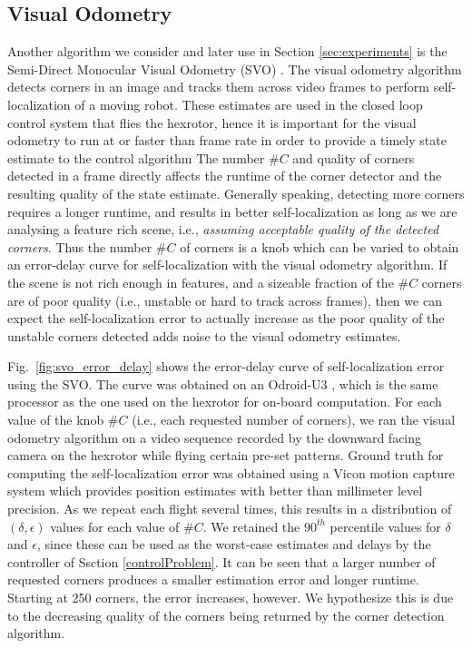 \subsection{Visual Odometry} \label{sec:visual_odometry}




Another algorithm we consider and later use in Section  \ref{sec:experiments} is the Semi-Direct Monocular Visual Odometry (SVO) \cite{forster2014svo}.
The visual odometry algorithm detects corners in an image and tracks them across video frames to perform self-localization of a moving robot.
These estimates are used in the closed loop control system that flies the hexrotor, hence it is important for the visual odometry to run at or faster than frame rate in order to provide a timely state estimate to the control algorithm
The number $\#C$ and quality of corners detected in a frame directly affects the runtime of the corner detector and the resulting quality of the state estimate. Generally speaking, detecting more corners requires a longer runtime, and results in better self-localization as long as we are analysing a feature rich scene, i.e., \emph{assuming acceptable quality of the detected corners}. Thus the number $\#C$ of corners is a knob which can be varied to obtain an error-delay curve for self-localization with the visual odometry algorithm.
If the scene is not rich enough in features, and a sizeable fraction of the $\#C$ corners are of poor quality (i.e., unstable or hard to track across frames), then we can expect the self-localization error to actually increase as the poor quality of the unstable corners detected adds noise to the visual odometry estimates.

Fig.~\ref{fig:svo_error_delay} shows the error-delay curve of self-localization error using the SVO. The curve was obtained on an Odroid-U3 \cite{Odroid}, which is the same processor as the one used on the hexrotor for on-board computation.
For each value of the knob $\#C$ (i.e., each requested number of corners), we ran the visual odometry algorithm on a video sequence recorded by the downward facing camera on the hexrotor while flying certain pre-set patterns.
Ground truth for computing the self-localization error was obtained using a Vicon motion capture system which provides position estimates with better than millimeter level precision.
As we repeat each flight several times, this results in a distribution of $(\delta,\epsilon)$ values for each value of $\#C$.
We retained the $90^{th}$ percentile values for $\delta$ and $\epsilon$, since these can be used as the worst-case estimates and delays by the controller of Ssction \ref{controlProblem}.
It can be seen that a larger number of requested corners produces a smaller estimation error and longer runtime.
Starting at 250 corners, the error increases, however.
We hypothesize this is due to the decreasing quality of the corners being returned by the corner detection algorithm. 

